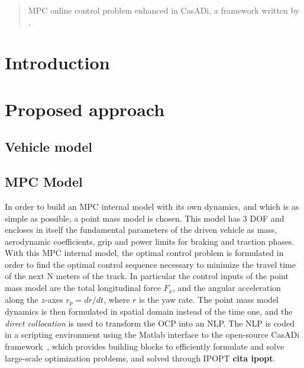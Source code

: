 \documentclass[conference]{IEEEtran} %
\begin{document}

\begin{abstract}
MPC online control problem enhanced in CasADi, a framework written by \citet{Andersson2019}.
\end{abstract}

\IEEEpeerreviewmaketitle

\section{Introduction}



\section{Proposed approach} %


\subsection{Vehicle model}

\subsection{MPC Model}
In order to build an MPC internal model with its own dynamics, and which is as simple as possible, a point mass model is chosen.
This model has 3 DOF and encloses in itself the fundamental parameters of the driven vehicle as mass, aerodynamic coefficients, grip and power limits for braking and traction phases.
With this MPC internal model, the optimal control problem is formulated in order to find the optimal control sequence necessary to minimize the travel time of the next N meters of the track. In particular the control inputs of the point mass model are the total longitudinal force $F_{x}$, and the angular acceleration along the $z$-axes $r_p = dr/dt$, where $r$ is the yaw rate.
The point mass model dynamics is then formulated in spatial domain instead of the time one, and the \textit{direct collocation} is used to transform the OCP into an NLP. The NLP is coded in a scripting environment using the Matlab interface to the open-source CasADi framework~\cite{Andersson2019}, which provides building
blocks to efficiently formulate and solve large-scale optimization problems, and solved through IPOPT \textbf{cita ipopt}.
\end{document}
